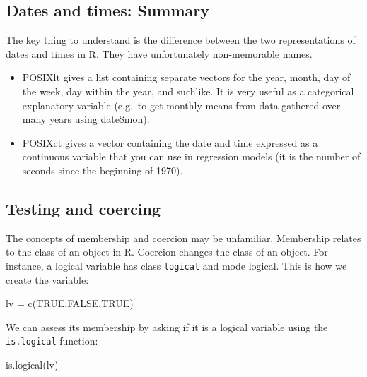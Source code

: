 \documentclass[
]{book}
\newenvironment{Shaded}{\begin{snugshade}}{\end{snugshade}}
\newcommand{\ConstantTok}[1]{\textcolor[rgb]{0.00,0.00,0.00}{#1}}
\newcommand{\FunctionTok}[1]{\textcolor[rgb]{0.00,0.00,0.00}{#1}}
\newcommand{\NormalTok}[1]{#1}
\newcommand{\OtherTok}[1]{\textcolor[rgb]{0.56,0.35,0.01}{#1}}
\providecommand{\tightlist}{%
  \setlength{\itemsep}{0pt}\setlength{\parskip}{0pt}}
\begin{document}
\hypertarget{dates-and-times-summary}{%
\subsection{Dates and times: Summary}\label{dates-and-times-summary}}

The key thing to understand is the difference between the two representations of dates and times in R. They have unfortunately non-memorable names.

\begin{itemize}
\tightlist
\item
  POSIXlt gives a list containing separate vectors for the year, month, day of the week, day within the year, and suchlike. It is very useful as a categorical explanatory variable (e.g.~to get monthly means from data gathered over many years using date\$mon).
\item
  POSIXct gives a vector containing the date and time expressed as a continuous variable that you can use in regression models (it is the number of seconds since the beginning of 1970).
\end{itemize}

\hypertarget{testing-and-coercing}{%
\subsection{Testing and coercing}\label{testing-and-coercing}}

The concepts of membership and coercion may be unfamiliar. Membership relates to the class of an object in R. Coercion changes the class of an object. For instance, a logical variable has class \texttt{logical} and mode logical. This is how we create the variable:

\begin{Shaded}
\begin{Highlighting}[]
\NormalTok{lv }\OtherTok{=} \FunctionTok{c}\NormalTok{(}\ConstantTok{TRUE}\NormalTok{,}\ConstantTok{FALSE}\NormalTok{,}\ConstantTok{TRUE}\NormalTok{)}
\end{Highlighting}
\end{Shaded}

We can assess its membership by asking if it is a logical variable using the \texttt{is.logical} function:

\begin{Shaded}
\begin{Highlighting}[]
\FunctionTok{is.logical}\NormalTok{(lv)}
\end{Highlighting}
\end{Shaded}
\end{document}
